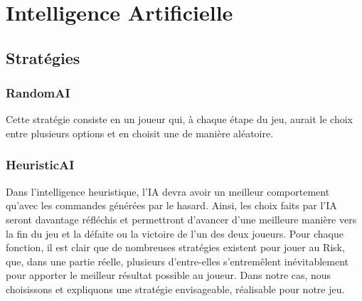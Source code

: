 \section{Intelligence Artificielle}

\subsection{Stratégies}

\subsubsection{RandomAI}
Cette stratégie consiste en un joueur qui, à chaque étape du jeu, aurait le choix entre plusieurs options et en choisit une de manière aléatoire.

\subsubsection{HeuristicAI}
Dans l'intelligence heuristique, l'IA devra avoir un meilleur comportement qu'avec les commandes générées par le hasard. Ainsi, les choix faits par l'IA seront davantage réfléchis et permettront d'avancer d'une meilleure manière vers la fin du jeu et la défaite ou la victoire de l'un des deux joueurs. 
Pour chaque fonction, il est clair que de nombreuses stratégies existent pour jouer au Risk, que, dans une partie réelle, plusieurs d'entre-elles s'entremêlent inévitablement pour apporter le meilleur résultat possible au joueur. Dans notre cas, nous choisissons et expliquons une stratégie envisageable, réalisable pour notre jeu.
\newline


